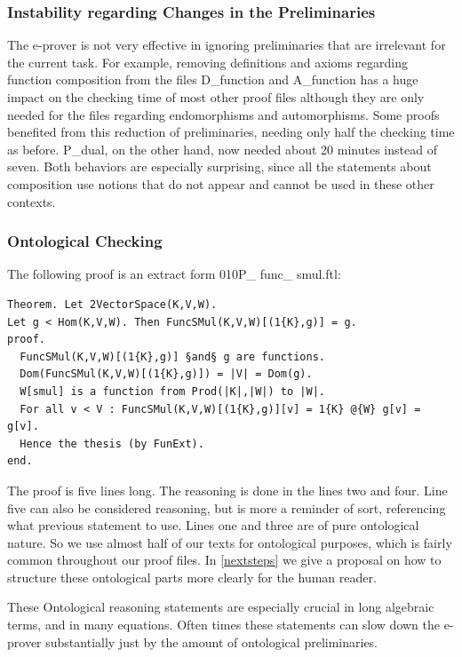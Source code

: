 \documentclass[11pt]{article}
\begin{document}
\subsubsection{Instability regarding Changes in the Preliminaries} \label{instabilites}
The e-prover is not very effective in ignoring preliminaries that are irrelevant for the current task.
For example, removing definitions and axioms regarding function composition from the files D\_function and A\_function has a huge impact on the checking time of most other proof files although they are only needed for the files regarding endomorphisms and automorphisms.
Some proofs benefited from this reduction of preliminaries, needing only half the checking time as before.
P\_dual, on the other hand, now needed about 20 minutes instead of seven.
Both behaviors are especially surprising, since all the statements about composition use notions that do not appear and cannot be used in these other contexts.


\subsubsection{Ontological Checking} \label{ontologialChecking}

The following proof is an extract form 010P\_ func\_ smul.ftl:
\begin{lstlisting}
Theorem. Let 2VectorSpace(K,V,W).
Let g < Hom(K,V,W). Then FuncSMul(K,V,W)[(1{K},g)] = g.
proof.
  FuncSMul(K,V,W)[(1{K},g)] §and§ g are functions.
  Dom(FuncSMul(K,V,W)[(1{K},g)]) = |V| = Dom(g).
  W[smul] is a function from Prod(|K|,|W|) to |W|.
  For all v < V : FuncSMul(K,V,W)[(1{K},g)][v] = 1{K} @{W} g[v] = g[v].
  Hence the thesis (by FunExt).
end.
\end{lstlisting}
The proof is five lines long. The reasoning is done in the lines two and four. Line five can also be considered reasoning, but is more a reminder of sort, referencing what previous statement to use. Lines one and three are of pure ontological nature. So we use almost half of our texts for ontological purposes, which is fairly common throughout our proof files. In \ref{nextsteps} we give a proposal on how to structure these ontological parts more clearly for the human reader.

These Ontological reasoning statements are especially crucial in long algebraic terms, and in many equations.
Often times these statements can slow down the e-prover substantially just by the amount of ontological preliminaries.
\end{document}
